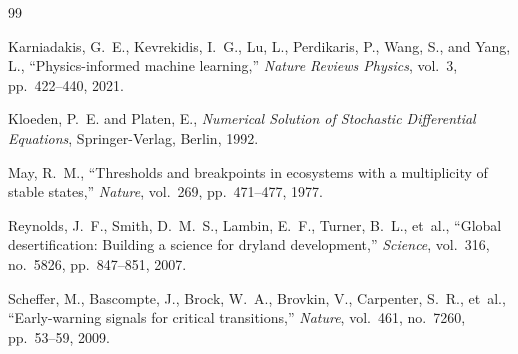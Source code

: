 \documentclass[12pt, a4paper]{article}
\begin{document}
\begin{thebibliography}{99}


Karniadakis, G.~E., Kevrekidis, I.~G., Lu, L., Perdikaris, P., Wang, S., and Yang, L.,
``Physics-informed machine learning,''
\emph{Nature Reviews Physics}, vol.~3, pp.~422--440, 2021.


Kloeden, P.~E. and Platen, E.,
\emph{Numerical Solution of Stochastic Differential Equations},
Springer-Verlag, Berlin, 1992.


May, R.~M.,
``Thresholds and breakpoints in ecosystems with a multiplicity of stable states,''
\emph{Nature}, vol.~269, pp.~471--477, 1977.



Reynolds, J.~F., Smith, D.~M.~S., Lambin, E.~F., Turner, B.~L., et~al.,
``Global desertification: Building a science for dryland development,''
\emph{Science}, vol.~316, no.~5826, pp.~847--851, 2007.

Scheffer, M., Bascompte, J., Brock, W.~A., Brovkin, V., Carpenter, S.~R., et~al.,
``Early-warning signals for critical transitions,''
\emph{Nature}, vol.~461, no.~7260, pp.~53--59, 2009.


\end{thebibliography}
\end{document}
